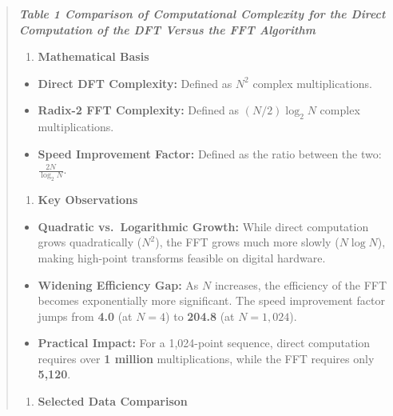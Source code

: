 \begin{quote}
\textbf{\emph{Table 1 Comparison of Computational Complexity for the
Direct Computation of the DFT Versus the FFT Algorithm}}

\begin{enumerate}
\def\labelenumi{\arabic{enumi}.}
\tightlist
\item
  \textbf{Mathematical Basis}
\end{enumerate}

\begin{itemize}
\tightlist
\item
  \textbf{Direct DFT Complexity:} Defined as \textbf{\(N^2\)} complex
  multiplications.
\item
  \textbf{Radix-2 FFT Complexity:} Defined as
  \textbf{\((N/2) \log_2 N\)} complex multiplications.
\item
  \textbf{Speed Improvement Factor:} Defined as the ratio between the
  two: \textbf{\(\frac{2N}{\log_2 N}\)}.
\end{itemize}

\begin{enumerate}
\def\labelenumi{\arabic{enumi}.}
\setcounter{enumi}{1}
\tightlist
\item
  \textbf{Key Observations}
\end{enumerate}

\begin{itemize}
\tightlist
\item
  \textbf{Quadratic vs.~Logarithmic Growth:} While direct computation
  grows quadratically (\(N^2\)), the FFT grows much more slowly
  (\(N \log N\)), making high-point transforms feasible on digital
  hardware.
\item
  \textbf{Widening Efficiency Gap:} As \(N\) increases, the efficiency
  of the FFT becomes exponentially more significant. The speed
  improvement factor jumps from \textbf{4.0} (at \(N=4\)) to
  \textbf{204.8} (at \(N=1,024\)).
\item
  \textbf{Practical Impact:} For a 1,024-point sequence, direct
  computation requires over \textbf{1 million} multiplications, while
  the FFT requires only \textbf{5,120}.
\end{itemize}

\begin{enumerate}
\def\labelenumi{\arabic{enumi}.}
\setcounter{enumi}{2}
\tightlist
\item
  \textbf{Selected Data Comparison}
\end{enumerate}


\end{quote}
